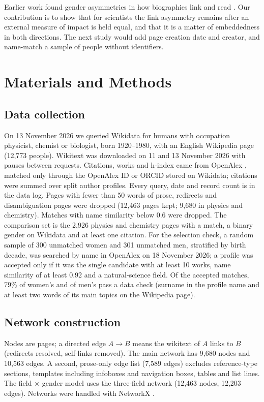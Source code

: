 \documentclass[9pt,twocolumn,twoside,lineno]{pnas-new}
\begin{document}
Earlier work found gender asymmetries in how biographies link and read \cite{wagner2015man,wagner2016glass,graells2015first}. Our contribution is to show that for scientists the link asymmetry remains after an external measure of impact is held equal, and that it is a matter of embeddedness in both directions. The next study would add page creation date and creator, and name-match a sample of people without identifiers.

\section*{Materials and Methods}

\subsection*{Data collection}
On 13 November 2026 we queried Wikidata \cite{vrandecic2014wikidata} for humans with occupation physicist, chemist or biologist, born 1920--1980, with an English Wikipedia page (12,773 people). Wikitext was downloaded on 11 and 13 November 2026 with pauses between requests. Citations, works and h-index came from OpenAlex \cite{priem2022openalex}, matched only through the OpenAlex ID or ORCID stored on Wikidata; citations were summed over split author profiles. Every query, date and record count is in the data log. Pages with fewer than 50 words of prose, redirects and disambiguation pages were dropped (12,463 pages kept; 9,680 in physics and chemistry). Matches with name similarity below 0.6 were dropped. The comparison set is the 2,926 physics and chemistry pages with a match, a binary gender on Wikidata and at least one citation. For the selection check, a random sample of 300 unmatched women and 301 unmatched men, stratified by birth decade, was searched by name in OpenAlex on 18 November 2026; a profile was accepted only if it was the single candidate with at least 10 works, name similarity of at least 0.92 and a natural-science field. Of the accepted matches, 79\% of women's and of men's pass a data check (surname in the profile name and at least two words of its main topics on the Wikipedia page).

\subsection*{Network construction}
Nodes are pages; a directed edge $A\to B$ means the wikitext of $A$ links to $B$ (redirects resolved, self-links removed). The main network has 9,680 nodes and 10,563 edges. A second, prose-only edge list (7,589 edges) excludes reference-type sections, templates including infoboxes and navigation boxes, tables and list lines. The field $\times$ gender model uses the three-field network (12,463 nodes, 12,203 edges). Networks were handled with NetworkX \cite{hagberg2008networkx}.
\end{document}
